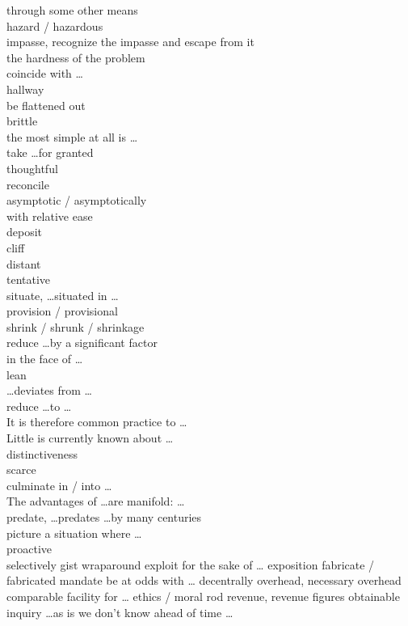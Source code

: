 \documentclass[12pt]{article}
\begin{document}
through some other means \\
hazard / hazardous \\
impasse, recognize the impasse and escape from it \\
the hardness of the problem \\
coincide with \dots \\
hallway \\
be flattened out \\
brittle \\
the most simple at all is \dots \\
take \dots for granted \\
thoughtful \\
reconcile \\
asymptotic / asymptotically \\
with relative ease \\
deposit \\
cliff \\
distant \\
tentative \\
situate, \dots situated in \dots \\
provision / provisional \\
shrink / shrunk / shrinkage \\
reduce \dots by a significant factor \\
in the face of \dots \\
lean \\
\dots deviates from \dots \\
reduce \dots to \dots \\
It is therefore common practice to \dots \\
Little is currently known about \dots \\
distinctiveness \\
scarce \\
culminate in / into \dots \\
The advantages of \dots are manifold: \dots \\
predate, \dots predates \dots by many centuries \\
picture a situation where \dots \\
proactive \\
selectively 
gist 
wraparound 
exploit 
for the sake of \dots 
exposition 
fabricate / fabricated 
mandate
be at odds with \dots 
decentrally 
overhead, necessary overhead 
comparable 
facility for \dots 
ethics / moral 
rod 
revenue, revenue figures 
obtainable 
inquiry 
\dots as is 
we don't know ahead of time \dots 
\end{document}
